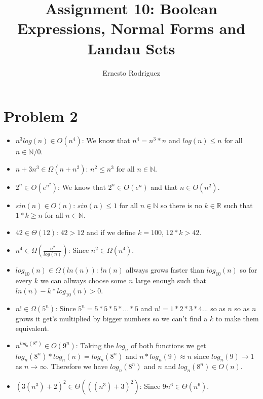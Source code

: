 \documentclass[11pt]{article}
\author{Ernesto Rodriguez}
\title{Assignment 10: Boolean Expressions, Normal Forms and Landau Sets}
\begin{document}
\maketitle

\section{Problem 2}

\begin{itemize}
\item{$n^3log(n) \in O(n^4)$: We know that $n^4=n^3 * n$ and $log(n)\leq n$ for all $n\in\mathbb{N}/0$.}
\item{$n+3n^3 \in \Omega (n+n^2)$: $n^2\leq n^3$ for all $n\in \mathbb{N}$.}
\item{$2^n \in O(e^{n^2})$: We know that $2^n \in O(e^n)$ and that $n \in O(n^2)$.}
\item{$sin(n) \in O(n)$: $sin(n) \leq 1$ for all $n \in \mathbb{N}$ so there is no $k\in\mathbb{R}$ such that $1*k\geq n$ for all $n \in \mathbb{N}$.}
\item{$42 \in \Theta(12)$: $42>12$ and if we define $k=100$, $12*k>42$.}
\item{$n^4 \in \Omega(\frac{n^2}{log(n)})$: Since $n^2 \in \Omega(n^4)$.}
\item{$log_{10}(n) \in \Omega(ln(n))$: $ln(n)$ allways grows faster than $log_{10}(n)$ so for every $k$ we can allways choose some $n$ large enough such that $ln(n)-k*log_{10}(n)>0$.}
\item{$n! \in \Omega(5^n)$: Since $5^n=5*5*5*...*5$ and $n!=1*2*3*4...$ so as $n$ so as $n$ grows it get's multiplied by bigger numbers so we can't find a $k$ to make them equivalent.}
\item{$n^{log_n(8^n)} \in O(9^n)$: Taking the $log_n$ of both functions we get $log_n(8^n)*log_n(n)=log_n(8^n)$ and $n*log_n(9)\approx n$ since $log_n(9) \rightarrow 1$ as $n \rightarrow \infty$. Therefore we have $log_n(8^n)$ and $n$ and $log_n(8^n)\in O(n)$.}
\item{$(3(n^3)+2)^2 \in \Theta(((n^3)+3)^2)$: Since $9n^6 \in \Theta(n^6)$.}
\end{itemize}
\end{document}
